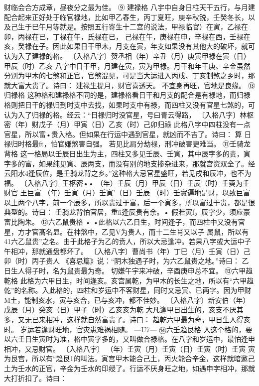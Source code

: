 财临会合方成章，昼夜分之最为佳。
⑨	建禄格
八宇中自身日柱天干五行，与月建配合起来正好处于临官禄地，比如甲乙春生，丙丁夏旺，庚辛秋锐，壬癸冬长，以及己生于巳午月等就是。按照五行寄生十二宫的说法，甲禄临官）在寅，乙禄在卯，丙禄在已，丁禄在午，氏禄在已，
己禄在午，庚禄在申，辛禄在西，壬禄在亥，癸禄在子。因此如果日干甲木，月支在寅，年支如果没有其他大的破坏，就可认为入了建禄的格。
〔入格八字〕贺丞相（年）辛丑（月）庚寅甲禄在寅（日）甲辰（时）乙亥
八字中日干甲，月建在寅，寅为甲禄。月干和年干庚、辛金虽然分别为甲木的七煞和正官，官煞混见，可是当大运进入丙戌、丁亥制煞之乡时，那就大富大贵了。诗曰：
建禄生提月，财官喜透天。
不宜身再旺，官地是良缘。
⑬归禄格
这种格和建禄格不同的是，建禄格看日干和月支的配合是有禄地，而归禄格则把日干的禄归到时支中去找，如果时支中有禄，而四柱又没有官星七煞的，可认为入了归禄的格。经云：“日禄归时没官星，号曰青云得路，
〔入格八字〕林枢密（年）财戊子（月）甲寅（日）乙亥（时）己卯归祿
此格八字中四柱没有一点官星，所以富•贵入格。但如果在行运中遇到官星，就凶而不吉了。诗曰：
算
日禄归时格最ft，怕官嫌煞害自强。
若见比肩分劫禄，刑冲破害更难当。
⑪壬骑龙背格
这一格局以壬辰日出生为主，四柱又多见壬辰、壬寅，其中辰字多的贵，寅字多的富，如果纯见寅、辰两支，而没有别的地支掺杂进来，那就宫资双全了。经云阳水4逢辰位，是壬骑龙背之乡。”这种格大忌官星盛旺，若见戌和辰冲，也不为福。
〔入格八字〕王枢密••
（年）壬辰（月）甲辰（日）壬辰（时）壬萸为壬财官
王巨富
（年）壬寅（月）壬寅'（日）壬辰
（时）壬實遍地是财，以致巨富
以上两个八字，前一个辰多，所以贵过于富，后一个寅多，所以富过于贵，都是很典型的。诗曰：
壬骑龙背怕官居，重fi逢辰贵有余。•
假若寅f，辰字少，须应豪富比陶朱。
⑫六乙鼠贵格	•
•此格以六乙日生，时间逢子，而四柱中又没有官星，方才官髙名显。在神煞中，乙见V为贵人，而十二生肖又以子
属鼠，所以有41六乙鼠贵”之名。由于此格子为乙的贲人，所以大忌逢冲。若果八字或大运中子午相冲，那就通盘都坏了。
〔入格八字〕曹尚书（年）丁巳（月）壬寅（日）己卯（时）丙子贵人
《喜忌篇》说：“阴木独遇子时，为六乙鼠贵之地。”诗曰：
乙日生人得子时，名为鼠贵最为奇。
切嫌午宇来冲破，辛酉庚申总不宜。
⑬六甲趋乾格
此格为六甲日生，时间逢亥。亥宫属乾，为甲木的长生之地，所以有“六甲趋乾”的名称。入此格的，四柱和岁运中不客财星，同时又忌寅、已两字。因为甲财M土，能制亥水，寅与亥合，已与亥冲，都不佳妙。
〔入格八字〕新安伯（年）戊辰（月）癸亥（日）甲子（时）乙亥亥为乾
大凡逢甲日出生的，亥支不厌其多，又无已来相冲，这样就自然富贵了。诗曰：
趋乾六甲最为奇，甲日生人得亥时。
岁运若逢财旺地，官灾患难祸相随。
—U7—
⑭六壬趋艮格
入这个格的，要以六壬日生寅时为准，格中寅字多的，又叫做合禄格。在八字和岁运中，最怕逢申相冲，又忌财官。
〔入格八宇〕
（年）壬寅（月）壬寅（日）壬寅（时）壬寅
寅为艮宫，所以有“趋艮1的叫法。寅宫甲木能合己土，丙火能合辛金，这样就暗遨己土为壬水的正官，辛金为壬水的印绶了。行运不厌身旺之地，如遇申字相冲，那就大打折扣了。诗曰：

